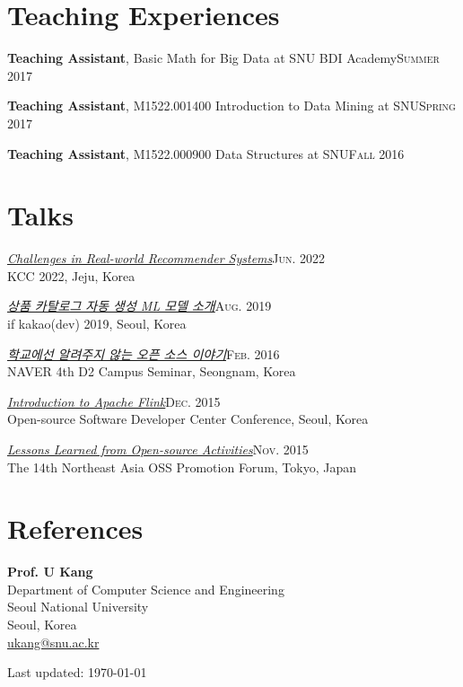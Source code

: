 \documentclass[11pt,a4paper]{article}
\renewenvironment{itemize}{
  \begin{list}{}{
    \setlength{\leftmargin}{1em}
    \setlength{\itemsep}{0.25em}
    \setlength{\parskip}{0pt}
    \setlength{\parsep}{0.25em}
  }
}{
  \end{list}
}
\begin{document}
\section*{Teaching Experiences}
\begin{itemize}
  \setlength\itemsep{0.1em}
  \item \textbf{Teaching Assistant}, Basic Math for Big Data at SNU BDI Academy\hfill\textsc{Summer 2017}
  \item \textbf{Teaching Assistant}, M1522.001400 Introduction to Data Mining at SNU\hfill\textsc{Spring 2017}
  \item \textbf{Teaching Assistant}, M1522.000900 Data Structures at SNU\hfill\textsc{Fall 2016}
\end{itemize}

\section*{Talks}
\begin{itemize}
  \item \href{https://speakerdeck.com/chiwanpark/challenges-in-real-world-recommender-systems}{\textit{Challenges in Real-world Recommender Systems}}\hfill\textsc{Jun. 2022}\\
        KCC 2022, Jeju, Korea
  \item \href{http://bit.ly/chiwanpark-ifkakao2019-new}{\textit{상품 카탈로그 자동 생성 ML 모델 소개}}\hfill\textsc{Aug. 2019}\\
        if kakao(dev) 2019, Seoul, Korea
  \item \href{http://j.mp/d2-campus-seminar-4th-park}{\textit{학교에선 알려주지 않는 오픈 소스 이야기}}\hfill\textsc{Feb. 2016}\\
        NAVER 4th D2 Campus Seminar, Seongnam, Korea
  \item \href{http://j.mp/ossdevconf-2015-park}{\textit{Introduction to Apache Flink}}\hfill\textsc{Dec. 2015}\\
        Open-source Software Developer Center Conference, Seoul, Korea
  \item \href{http://j.mp/cjkossforum-2015-park}{\textit{Lessons Learned from Open-source Activities}}\hfill\textsc{Nov. 2015}\\
        The 14th Northeast Asia OSS Promotion Forum, Tokyo, Japan
\end{itemize}

\section*{References}
\begin{itemize}
  \item \textbf{Prof. U Kang}\\
        Department of Computer Science and Engineering\\
        Seoul National University\\
        Seoul, Korea\\
        \href{mailto:ukang@snu.ac.kr}{ukang@snu.ac.kr}
\end{itemize}

\bigskip
{\small Last updated: \today}
\end{document}
